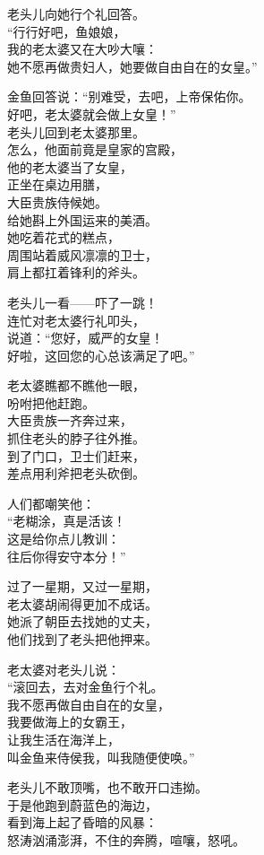 \documentclass[]{book}
\renewenvironment{quote}{\begin{VF}}{\end{VF}}
\begin{document}
\begin{quote}
老头儿向她行个礼回答。\\
``行行好吧，鱼娘娘，\\
我的老太婆又在大吵大嚷：\\
她不愿再做贵妇人，她要做自由自在的女皇。''

金鱼回答说：``别难受，去吧，上帝保佑你。\\
好吧，老太婆就会做上女皇！''\\
老头儿回到老太婆那里。\\
怎么，他面前竟是皇家的宫殿，\\
他的老太婆当了女皇，\\
正坐在桌边用膳，\\
大臣贵族侍候她。\\
给她斟上外国运来的美酒。\\
她吃着花式的糕点，\\
周围站着威风凛凛的卫士，\\
肩上都扛着锋利的斧头。

老头儿一看------吓了一跳！\\
连忙对老太婆行礼叩头，\\
说道：``您好，威严的女皇！\\
好啦，这回您的心总该满足了吧。''

老太婆瞧都不瞧他一眼，\\
吩咐把他赶跑。\\
大臣贵族一齐奔过来，\\
抓住老头的脖子往外推。\\
到了门口，卫士们赶来，\\
差点用利斧把老头砍倒。

人们都嘲笑他：\\
``老糊涂，真是活该！\\
这是给你点儿教训：\\
往后你得安守本分！''

过了一星期，又过一星期，\\
老太婆胡闹得更加不成话。\\
她派了朝臣去找她的丈夫，\\
他们找到了老头把他押来。

老太婆对老头儿说：\\
``滚回去，去对金鱼行个礼。\\
我不愿再做自由自在的女皇，\\
我要做海上的女霸王，\\
让我生活在海洋上，\\
叫金鱼来侍侯我，叫我随便使唤。''

老头儿不敢顶嘴，也不敢开口违拗。\\
于是他跑到蔚蓝色的海边，\\
看到海上起了昏暗的风暴：\\
怒涛汹涌澎湃，不住的奔腾，喧嚷，怒吼。


\end{quote}
\end{document}
